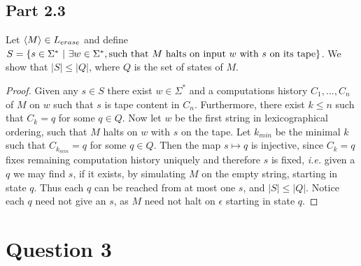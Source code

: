 \documentclass[a4paper,11pt]{article}
\newcommand{\abs}[1]{\left\lvert #1 \right\rvert}
\newcommand{\ie}{\emph{i.e.} }
\newcommand{\pipe}{\ \vert \ }
\numberwithin{equation}{section}
\begin{document}
\subsection*{Part 2.3}
Let $ \braket{M}\in L_{erase} $ and define $ S=\{s\in\Sigma^*\pipe \exists w\in\Sigma^*, \text{such that }M\text{ halts on input $ w $ with $ s $ on its tape}\} $. We show that $ \abs{S}\leq\abs{Q} $, where $ Q$ is the set of states of $ M $.\begin{proof}
	Given any $ s\in S $ there exist $ w\in \Sigma^* $ and a computations history $ C_1,...,C_n $ of $ M $ on $ w $ such that $ s $ is tape content in $ C_n $. Furthermore, there exist $ k\leq n $ such that $ C_k=q $ for some $ q\in Q $. Now let $ w $ be the first string in lexicographical ordering, such that $ M $ halts on $ w $ with $ s $ on the tape. Let $ k_{min} $ be the minimal $ k $ such that $ C_{k_{min}}=q $ for some $ q\in Q $. Then the map $ s\mapsto q  $ is injective, since $ C_k=q $ fixes remaining computation history uniquely and therefore $ s $ is fixed, \ie given a $ q $ we may find $ s $, if it exists, by simulating $ M $ on the empty string, starting in state $ q $. Thus each $ q $ can be reached from at most one $ s $, and $ \abs{S}\leq \abs{Q} $. Notice each $ q $ need not give an $ s $, as $ M $ need not halt on $ \epsilon$ starting in state $ q $. 
\end{proof}

\section*{Question 3}
\end{document}
